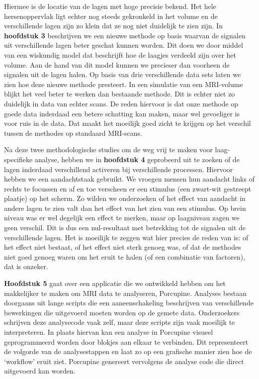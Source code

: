 Hiermee is de locatie van de lagen met hoge precisie bekend. Het hele hersenoppervlak ligt echter nog steeds gekronkeld in het volume en de verschillende lagen zijn zo klein dat ze nog niet duidelijk te zien zijn. In \textbf{hoofdstuk 3} beschrijven we een nieuwe methode op basis waarvan de signalen uit verschillende lagen beter geschat kunnen worden. Dit doen we door middel van een wiskundig model dat beschrijft hoe de laagjes verdeeld zijn over het volume. Aan de hand van dit model kunnen we precieser dan voorheen de signalen uit de lagen halen. Op basis van drie verschillende data sets laten we zien hoe deze nieuwe methode presteert. In een simulatie van een MRI-volume blijkt het veel beter te werken dan bestaande methode. Dit is echter niet zo duidelijk in data van echter scans. De reden hiervoor is dat onze methode op goede data inderdaad een betere schatting kan maken, maar wel gevoeliger is voor ruis in de data. Dat maakt het moeilijk goed zicht te krijgen op het verschil tussen de methodes op standaard MRI-scans.

Na deze twee methodologische studies om de weg vrij te maken voor laag-specifieke analyse, hebben we in \textbf{hoofdstuk 4} geprobeerd uit te zoeken of de lagen inderdaad verschillend activeren bij verschillende processen. Hiervoor hebben we een aandachtstaak gebruikt. We vroegen mensen hun aandacht links of rechts te focussen en af en toe verscheen er een stimulus (een zwart-wit gestreept plaatje) op het scherm. Zo wilden we onderzoeken of het effect van aandacht in andere lagen te zien valt dan het effect van het zien van een stimulus. Op brein niveau was er wel degelijk een effect te merken, maar op laagniveau zagen we geen verschil. Dit is dus een nul-resultaat met betrekking tot de signalen uit de verschillende lagen. Het is moeilijk te zeggen wat hier precies de reden van is: of het effect niet bestaat, of het effect niet sterk genoeg was, of dat de methodes niet goed genoeg waren om het eruit te halen (of een combinatie van factoren), dat is onzeker.

\textbf{Hoofdstuk 5} gaat over een applicatie die we ontwikkeld hebben om het makkelijker te maken om MRI data te analyseren, Porcupine. Analyses bestaan doorgaans uit lange scripts die een aaneenschakeling beschrijven van verschillende bewerkingen die uitgevoerd moeten worden op de gemete data. Onderzoekers schrijven deze analysecode vaak zelf, maar deze scripts zijn vaak moeilijk te interpreteren. In plaats hiervan kan een analyse in Porcupine visueel geprogrammeerd worden door blokjes aan elkaar te verbinden. Dit representeert de volgorde van de analysestappen en laat zo op een grafische manier zien hoe de `workflow' eruit ziet. Porcupine genereert vervolgens de analyse code die direct uitgevoerd kan worden.






